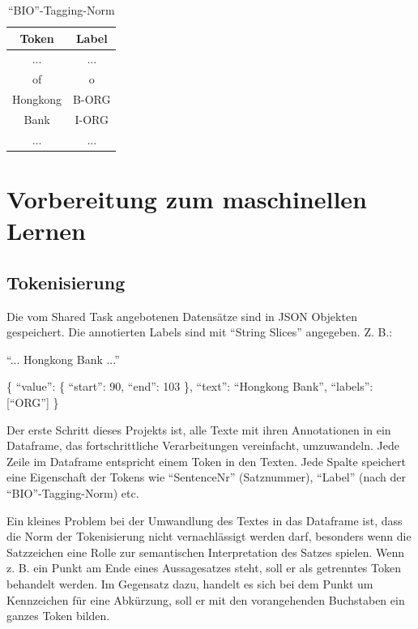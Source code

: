 \documentclass[paper=A4, ngerman, fontsize=12pt]{article}
\begin{document}
	\begin{table}
		\begin{center}
			\begin{tabular}{@{}| c | c | @{}}
				\toprule
				Token & Label   \\ \midrule
				\hline
				... & ...  \\ \midrule
				of & o  \\ \midrule
				Hongkong & B-ORG \\   \midrule
				Bank & I-ORG \\   \midrule
				... & ... \\  \bottomrule
			\end{tabular}
			\caption{ \enquote{BIO}-Tagging-Norm}
		\end{center}
	\end{table}	
	
	\section{Vorbereitung zum maschinellen Lernen}
	
	\subsection{Tokenisierung}
	\noindent
	Die vom Shared Task angebotenen Datensätze sind in JSON Objekten gespeichert. Die annotierten Labels sind mit \enquote{String Slices} angegeben. Z. B.: 
	
	\indent
	 \enquote{... Hongkong Bank ...}
	 
	 \indent
	\{ \enquote{value}: \{ \enquote{start}: 90, \enquote{end}: 103 \}, \enquote{text}: \enquote{Hongkong Bank}, \enquote{labels}: [\enquote{ORG}] \} 
	
	Der erste Schritt dieses Projekts ist, alle Texte mit ihren Annotationen in ein Dataframe, das fortschrittliche Verarbeitungen vereinfacht, umzuwandeln. Jede Zeile im Dataframe entspricht einem Token in den Texten. Jede Spalte speichert eine Eigenschaft der Tokens wie \enquote{SentenceNr} (Satznummer), \enquote{Label} (nach der \enquote{BIO}-Tagging-Norm) etc. 
	
	\indent
	Ein kleines Problem bei der Umwandlung des Textes in das Dataframe ist, dass die Norm der Tokenisierung nicht vernachlässigt werden darf, besonders wenn die Satzzeichen eine Rolle zur semantischen Interpretation des Satzes spielen. Wenn z. B. ein Punkt am Ende eines Aussagesatzes steht, soll er als getrenntes Token behandelt werden. Im Gegensatz dazu, handelt es sich bei dem Punkt um Kennzeichen für eine Abkürzung, soll er mit den vorangehenden Buchstaben ein ganzes Token bilden. 
	
\end{document}
